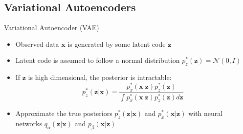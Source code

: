 \documentclass{beamer}
\newcommand{\vect}[1]{\boldsymbol{#1}}
\theoremstyle{definition}
\begin{document}
\subsection{Variational Autoencoders}
\begin{frame}{Variational Autoencoder (VAE)}
\begin{itemize}
  \item Observed data $\vect x$ is generated by some latent code $\vect z$%
  \item Latent code is assumed to follow a normal distribution $p_z^*(\vect z) = \mathcal{N}(0,I)$
  \item If $\vect z$ is high dimensional, the posterior is intractable:
    \[p_z^*(\vect z | \vect x) = \frac{p_x^*(\vect x | \vect z) p_z^*(\vect z)}{\displaystyle \int p_x^*(\vect x | \vect z) p_z^*(\vect z) d\vect z}\]
  \item Approximate the true posteriors $p_z^*(\vect z | \vect x)$ and $p_x^*(\vect x | \vect z)$ with neural networks $q_\alpha(\vect z | \vect x)$ and $p_\beta(\vect x | \vect z)$


\end{itemize}
\end{frame}
\end{document}
